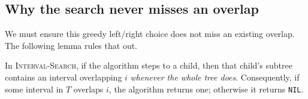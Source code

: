\subsection{Why the search never misses an overlap}

We must ensure this greedy left/right choice does not miss an existing
overlap. The following lemma rules that out.

\begin{lemma}
\label{ch14:interval-correct}
In \textsc{Interval-Search}, if the algorithm steps to a child, then that child's
subtree contains an interval overlapping $i$ \emph{whenever the whole tree
does}. Consequently, if some interval in $T$ overlaps $i$, the algorithm returns
one; otherwise it returns \texttt{NIL}.
\end{lemma}


